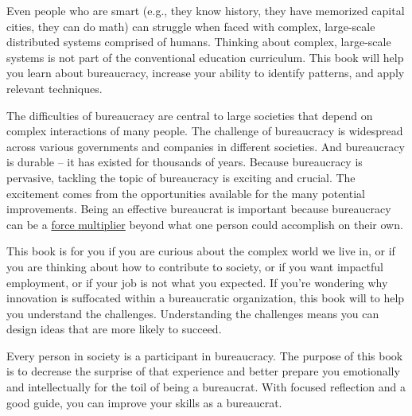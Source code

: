 Even people who are smart (e.g., they know history, they have memorized capital cities, they can do math) can struggle when faced with complex, large-scale distributed systems comprised of humans. Thinking about complex, large-scale systems is not part of the conventional education curriculum. This book will help you learn about bureaucracy, increase your ability to identify patterns, and apply relevant techniques.


The difficulties of bureaucracy are central to large societies that depend on complex interactions of many people. The challenge of bureaucracy is widespread across various governments and companies in different societies. And bureaucracy is durable -- it has existed for thousands of years. Because bureaucracy is pervasive, tackling the topic of bureaucracy is exciting and crucial. The excitement comes from the opportunities available for the many potential improvements.
Being an effective bureaucrat is important because bureaucracy can be a \href{https://en.wikipedia.org/wiki/Force_multiplication}{force multiplier}
beyond what one person could accomplish on their own.


This book is for you if you are curious about the complex world we live in, or if you are thinking about how to contribute to society, or if you want impactful employment, or if your job is not what you expected. If you're wondering why innovation is suffocated within a bureaucratic organization, this book will to help you understand the challenges. Understanding the challenges means you can design ideas that are more likely to succeed.


Every person in society is a participant in bureaucracy. The purpose of this book is to decrease the surprise of that experience and better prepare you emotionally and intellectually for the toil of being a bureaucrat. With focused reflection and a good guide, you can improve your skills as a bureaucrat. 

